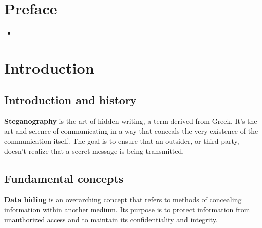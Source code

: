 

\newcommand{\tab}{\hspace{\parindent}}

\begin{titlepage}
\bordertitle
\begin{center}
\vspace{\fill} \maintitle \\ \vspace{\fill} \bottitle
\end{center}
\end{titlepage}
\newpage
{}
\tableofcontents
\thispagestyle{empty}
\newpage
\chapter*{ Preface }
\thispagestyle{empty}
\vspace{\fill}
\begin{itemize}
\item 
\end{itemize}
\vspace{\fill}
\newpage
\setcounter{page}{1}
\chapter{ Introduction }
\section{Introduction and history}
    \textbf{Steganography} is the art of hidden writing, a term derived from
    Greek. It's the art and science of communicating in a way that conceals the
    very existence of the communication itself. The goal is to ensure that an
    outsider, or third party, doesn't realize that a secret message is being
    transmitted.
\section{Fundamental concepts}
    \textbf{Data hiding} is an overarching concept that refers to methods of
    concealing information within another medium. Its purpose is to protect
    information from unauthorized access and to maintain its confidentiality
    and integrity.\\
    
